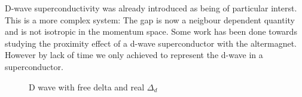 \documentclass[..\main.tex]{subfile}
\begin{document}
D-wave superconductivity was already introduced as being of particular interst. This is a more complex system:
The gap is now a neigbour dependent quantity and is not isotropic in the momentum space. Some work has been done towards studying the
proximity effect of a d-wave superconductor with the altermagnet. However by lack of time we only achieved to represent the d-wave in a superconductor.

\begin{figure}[H]
    
    \caption{D wave with free delta and real $\Delta_d$}
\end{figure}



\end{document}
